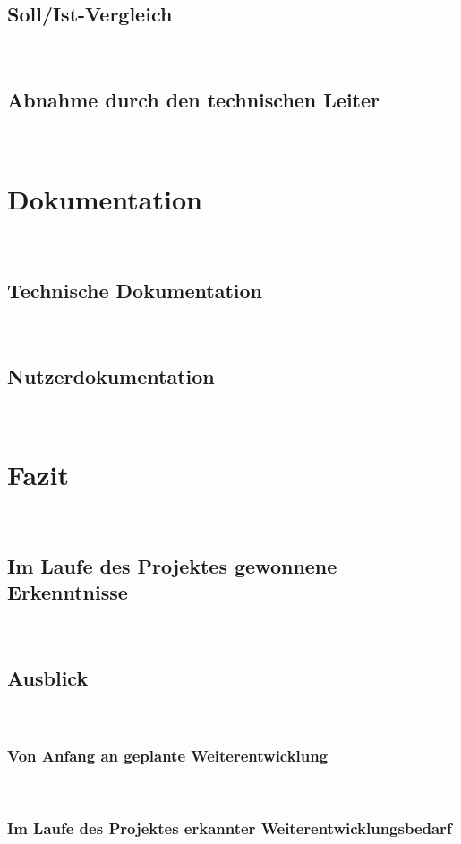 \documentclass[11pt,toc=sectionentrywithoutdots, 
headheight=44pt, headings=optiontoheadandtoc, hyperfootnotes=false]{scrartcl}
\begin{document}
\subsection{Soll/Ist-Vergleich}
\blindtext\

\subsection{Abnahme durch den technischen Leiter}
\blindtext\

\section{Dokumentation}
\blindtext\

\subsection{Technische Dokumentation}
\blindtext\

\subsection{Nutzerdokumentation}
\blindtext\

\section{Fazit}
\blindtext\

\subsection{Im Laufe des Projektes gewonnene Erkenntnisse}
\blindtext\

\subsection{Ausblick}
\blindtext\

\subsubsection{Von Anfang an geplante Weiterentwicklung}
\blindtext\

\subsubsection{Im Laufe des Projektes erkannter Weiterentwicklungsbedarf}
\blindtext\


\newpage
\setcounter{secnumdepth}{0}
\end{document}
